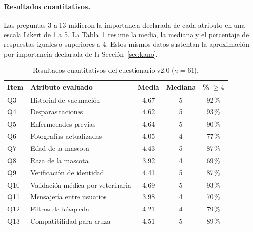 \documentclass[journal,onecolumn]{IEEEtran}
\begin{document}
	\paragraph{Resultados cuantitativos.}
	Las preguntas 3 a 13 midieron la importancia declarada de cada atributo en
	una escala Likert de 1 a 5. La Tabla~\ref{tab:cuestionario-resultados}
	resume la media, la mediana y el porcentaje de respuestas iguales o
	superiores a 4. Estos mismos datos sustentan la aproximación por importancia
	declarada de la Sección~\ref{sec:kano}.
	
	\begin{table}[H]
		\centering
		\caption{Resultados cuantitativos del cuestionario v2.0 ($n = 61$).}
		\label{tab:cuestionario-resultados}
		\small
		\begin{tabularx}{\textwidth}{@{}l X c c c@{}}
			\toprule
			\textbf{Ítem} & \textbf{Atributo evaluado} & \textbf{Media} & \textbf{Mediana} & \textbf{\% $\geq 4$} \\
			\midrule
			
			Q3 & Historial de vacunación & 4.67 & 5 & 92\,\% \\
			
			Q4 & Desparasitaciones & 4.62 & 5 & 93\,\% \\
			
			Q5 & Enfermedades previas & 4.64 & 5 & 90\,\% \\
			
			Q6 & Fotografías actualizadas & 4.05 & 4 & 77\,\% \\
			
			Q7 & Edad de la mascota & 4.43 & 5 & 87\,\% \\
			
			Q8 & Raza de la mascota & 3.92 & 4 & 69\,\% \\
			
			Q9 & Verificación de identidad & 4.41 & 5 & 87\,\% \\
			
			Q10 & Validación médica por veterinaria & 4.69 & 5 & 93\,\% \\
			
			Q11 & Mensajería entre usuarios & 3.98 & 4 & 70\,\% \\
			
			Q12 & Filtros de búsqueda & 4.21 & 4 & 79\,\% \\
			
			Q13 & Compatibilidad para cruza & 4.51 & 5 & 89\,\% \\
			
			\bottomrule
		\end{tabularx}
	\end{table}
	
\end{document}
